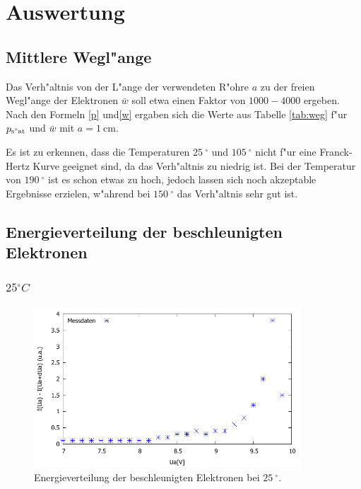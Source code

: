 \section{Auswertung}
\label{sec:auswertung}

\subsection{Mittlere Wegl"ange} %
\label{sub:mittlere_wegl_ange}



Das Verh"altnis von der L"ange der verwendeten R"ohre $a$ zu der freien Wegl"ange der Elektronen $\bar{w}$ soll etwa einen Faktor von $1000 - 4000$ ergeben.
Nach den Formeln \eqref{p} und\eqref{w} ergaben sich die Werte aus Tabelle \ref{tab:weg} f"ur $p_\mathrm{s"at}$ und $\bar{w}$ mit $a = \SI{1}{\centi\meter}$.

Es ist zu erkennen, dass die Temperaturen $\SI{25}{^\circ}$ und $\SI{105}{^\circ}$ nicht f"ur eine Franck-Hertz Kurve geeignet sind, da das Verh"altnis zu niedrig ist.
Bei der Temperatur von $\SI{190}{^\circ}$ ist es schon etwas zu hoch, jedoch lassen sich noch akzeptable Ergebnisse erzielen, w"ahrend bei $\SI{150}{^\circ}$ das Verh"altnis sehr gut ist.

\subsection{Energieverteilung der beschleunigten Elektronen} %
\label{sub:energieverteilung_der_beschleunigten_elektronen}

\subsubsection{$\si{25}{^\circ C}$} %
\label{sub:_si}



\begin{figure}[!h]
	\centering
	\includegraphics[width = 10cm]{img/t20.pdf}
	\caption{Energieverteilung der beschleunigten Elektronen bei $\SI{25}{^\circ}$.}
	\label{gra}
\end{figure}

